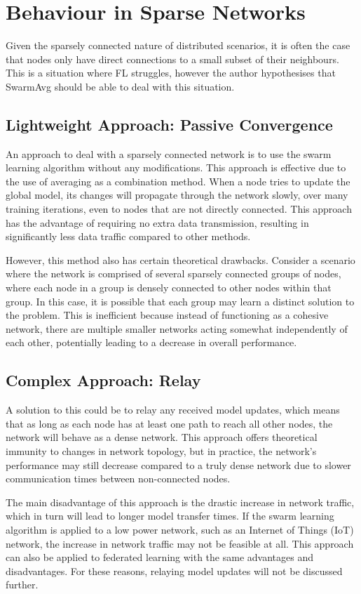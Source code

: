 \section{Behaviour in Sparse Networks}
Given the sparsely connected nature of distributed scenarios, it is often the case that nodes only have direct connections to a small subset of their neighbours. This is a situation where FL struggles, however the author hypothesises that SwarmAvg should be able to deal with this situation.

\subsection{Lightweight Approach: Passive Convergence}
An approach to deal with a sparsely connected network is to use the swarm learning algorithm without any modifications. This approach is effective due to the use of averaging as a combination method. When a node tries to update the global model, its changes will propagate through the network slowly, over many training iterations, even to nodes that are not directly connected. This approach has the advantage of requiring no extra data transmission, resulting in significantly less data traffic compared to other methods.

However, this method also has certain theoretical drawbacks. Consider a scenario where the network is comprised of several sparsely connected groups of nodes, where each node in a group is densely connected to other nodes within that group. In this case, it is possible that each group may learn a distinct solution to the problem. This is inefficient because instead of functioning as a cohesive network, there are multiple smaller networks acting somewhat independently of each other, potentially leading to a decrease in overall performance.


\subsection{Complex Approach: Relay} \label{relay}
A solution to this could be to relay any received model updates, which means that as long as each node has at least one path to reach all other nodes, the network will behave as a dense network. This approach offers theoretical immunity to changes in network topology, but in practice, the network's performance may still decrease compared to a truly dense network due to slower communication times between non-connected nodes.

The main disadvantage of this approach is the drastic increase in network traffic, which in turn will lead to longer model transfer times. If the swarm learning algorithm is applied to a low power network, such as an Internet of Things (IoT) network, the increase in network traffic may not be feasible at all. This approach can also be applied to federated learning with the same advantages and disadvantages. For these reasons, relaying model updates will not be discussed further.
